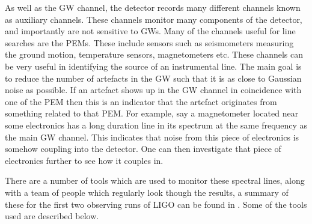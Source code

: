 %
As well as the \gls{GW} channel, the detector records many different channels known as auxiliary channels. 
These channels monitor many components of the detector, and importantly are not sensitive to \glspl{GW}.
Many of the channels useful for line searches are the \glspl{PEM}.
These include sensors such as seismometers measuring the ground motion, temperature sensors, magnetometers etc. 
These channels can be very useful in identifying the source of an instrumental line.
The main goal is to reduce the number of artefacts in the \gls{GW} such that it is as close to Gaussian noise as possible.
If an artefact shows up in the \gls{GW} channel in coincidence with one of the \gls{PEM} then this is an indicator that the artefact originates from something related to that \gls{PEM}.
For example, say a magnetometer located near some electronics has a long duration line in its spectrum at the same frequency as the main \gls{GW} channel. 
This indicates that noise from this piece of electronics is somehow coupling into the detector. 
One can then investigate that piece of electronics further to see how it couples in.

%

There are a number of tools which are used to monitor these spectral lines, along with a team of people which regularly look though the results, a summary of these for the first two observing runs of \gls{LIGO} can be found in \citep{covas2018IdentificationMitigation}.
Some of the tools used are described below. 

